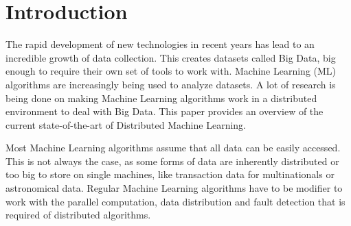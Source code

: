 \section{Introduction}


The rapid development of new technologies in recent years has lead to an incredible growth of data collection. This creates datasets called Big Data, big enough to require their own set of tools to work with. Machine Learning (ML) algorithms are increasingly being used to analyze datasets. A lot of research is being done on making Machine Learning algorithms work in a distributed environment to deal with Big Data. This paper provides an overview of the current state-of-the-art of Distributed Machine Learning.

Most Machine Learning algorithms assume that all data can be easily accessed. This is not always the case, as some forms of data are inherently distributed or too big to store on single machines, like transaction data for multinationals or astronomical data. Regular Machine Learning algorithms have to be modifier to work with the parallel computation, data distribution and fault detection that is required of distributed algorithms.

